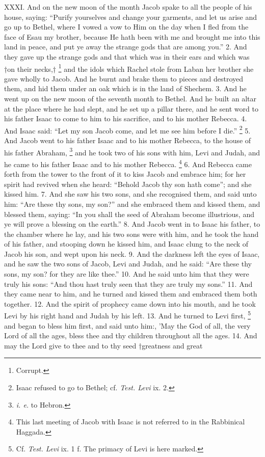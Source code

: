 
XXXI. And on the new moon of the month Jacob spake to all the people of his house, saying: ``Purify yourselves and change your garments, and let us arise and go up to Bethel, where I vowed a vow to Him on the day when I fled from the face of Esau my brother, because He hath been with me and brought me into this land in peace, and put ye away the strange gods that are among you.'' 2. And they gave up the strange gods and that which was in their ears and which was †on their necks,† \footnote{Corrupt.} and the idols which Rachel stole from Laban her brother she gave wholly to Jacob. And he burnt and brake them to pieces and destroyed them, and hid them under an oak which is in the land of Shechem. 3. And he went up on the new moon of the seventh month to Bethel. And he built an altar at the place where he had slept, and he set up a pillar there, and he sent word to his father Isaac to come to him to his sacrifice, and to his mother Rebecca. 4. And Isaac said: ``Let my son Jacob come, and let me see him before I die.'' \footnote{Isaac refused to go to Bethel; cf. \emph{Test. Levi} ix. 2.} 5. And Jacob went to his father Isaac and to his mother Rebecca, to the house of his father Abraham, \footnote{\emph{i. e.} to Hebron.} and he took two of his sons with him, Levi and Judah, and he came to his father Isaac and to his mother Rebecca. \footnote{This last meeting of Jacob with Isaac is not referred to in the Rabbinical Haggada.} 6. And Rebecca came forth from the tower to the front of it to kiss Jacob and embrace him; for her spirit had revived when she heard: ``Behold Jacob thy son hath come''; and she kissed him. 7. And she saw his two sons, and she recognised them, and said unto him: ``Are these thy sons, my son?'' and she embraced them and kissed them, and blessed them, saying: ``In you shall the seed of Abraham become illustrious, and ye will prove a blessing on the earth.'' 8. And Jacob went in to Isaac his father, to the chamber where he lay, and his two sons were with him, and he took the hand of his father, and stooping down he kissed him, and Isaac clung to the neck of Jacob his son, and wept upon his neck. 9. And the darkness left the eyes of Isaac, and he saw the two sons of Jacob, Levi and Judah, and he said: ``Are these thy sons, my son? for they are like thee.'' 10. And he said unto him that they were truly his sons: ``And thou hast truly seen that they are truly my sons.'' 11. And they came near to him, and he turned and kissed them and embraced them both together. 12. And the spirit of prophecy came down into his mouth, and he took Levi by his right hand and Judah by his left. 13. And he turned to Levi first, \footnote{Cf. \emph{Test. Levi} ix. 1 f. The primacy of Levi is here marked.} and began to bless him first, and said unto him:, 'May the God of all, the very Lord of all the ages, bless thee and thy children throughout all the ages. 14. And may the Lord give to thee and to thy seed †greatness and great

